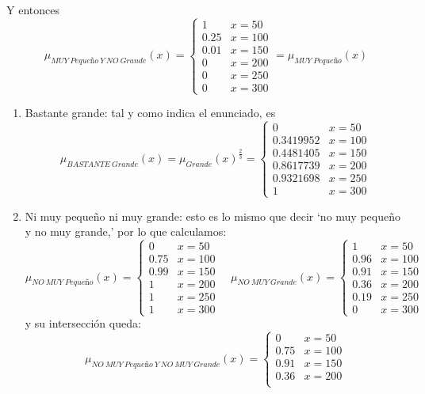 \documentclass[
]{article}
\begin{document}
Y entonces
\[\mu_{MUY\ Pequeño\ Y\ NO\ Grande}\left(x\right)=\begin{cases}
1 & x=50\\
0.25 & x=100\\
0.01 & x=150\\
0 & x=200\\
0 & x=250\\
0 & x=300
\end{cases}=\mu_{MUY\ Pequeño}\left(x\right)\]

\begin{enumerate}
\def\labelenumi{\arabic{enumi}.}
\setcounter{enumi}{5}
\item
  Bastante grande: tal y como indica el enunciado, es
  \[\mu_{BASTANTE\ Grande}\left(x\right)=\mu_{Grande}\left(x\right)^{\frac{2}{3}}=\begin{cases}
  0 & x=50\\
  0.3419952 & x=100\\
  0.4481405 & x=150\\
  0.8617739 & x=200\\
  0.9321698 & x=250\\
  1 & x=300
  \end{cases}\]
\item
  Ni muy pequeño ni muy grande: esto es lo mismo que decir `no muy
  pequeño y no muy grande,' por lo que calculamos:
  \[\mu_{NO\ MUY\ Pequeño}\left(x\right)=\begin{cases}
  0 & x=50\\
  0.75 & x=100\\
  0.99 & x=150\\
  1 & x=200\\
  1 & x=250\\
  1 & x=300
  \end{cases} \quad \mu_{NO\ MUY\ Grande}\left(x\right)=\begin{cases}
  1 & x=50\\
  0.96 & x=100\\
  0.91 & x=150\\
  0.36 & x=200\\
  0.19 & x=250\\
  0 & x=300
  \end{cases}\] y su intersección queda:
  \[\mu_{NO\ MUY\ Pequeño\ Y\ NO\ MUY\ Grande}\left(x\right)=\begin{cases}
  0 & x=50\\
  0.75 & x=100\\
  0.91 & x=150\\
  0.36 & x=200\\

\end{cases}\]
\end{enumerate}
\end{document}
